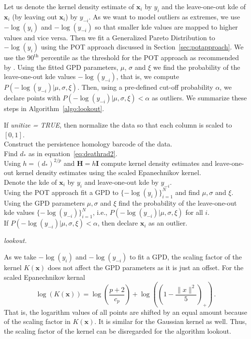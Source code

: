 \documentclass[letter,12pt]{article}
\begin{document}
Let us denote the kernel density estimate of $\bm{x}_i$ by $y_i$ and the leave-one-out kde of $\bm{x}_i$ (by leaving out $\bm{x}_i$) by $y_{-i}$. As we want to model outliers as extremes, we use $-\log(y_i)$ and $-\log(y_{-i})$ so that smaller kde values are mapped to higher values and vice versa.  Then we fit a Generalized Pareto Distribution to  $-\log(y_i)$ using the POT approach discussed in Section~\ref{sec:potapproach}. We use the $90^{\text{th}}$ percentile as the threshold for the POT approach as recommended by \cite{bommier2014peaks}. Using the fitted GPD parameters, $\mu$, $\sigma$ and $\xi$ we find the probability of the  leave-one-out kde values $-\log(y_{-i})$, that is,  we compute $P\left(-\log(y_{-i})|\mu, \sigma,\xi \right)$. Then, using a pre-defined cut-off probability $\alpha$, we declare points with $P\left(-\log(y_{-i})|\mu, \sigma,\xi \right) < \alpha$ as outliers. We summarize these steps in Algorithm~\ref{algo:lookout}.
\DontPrintSemicolon
\begin{algorithm}\fontsize{11}{12}\selectfont
	 If \textit{unitize = TRUE}, then normalize the data so that each column is scaled to $[0,1]$.\\
	 Construct the persistence homology barcode of the data. \\
	 Find $d_*$ as in equation~\eqref{eq:deathrad2}. \\
	 Using $h = (d_*)^{2/p}$ and $\bm{H} = h\bm{I}$ compute kernel density estimates  and leave-one-out kernel density estimates using the scaled Epanechnikov kernel. \\
	 Denote the kde of $\bm{x}_i$ by $y_i$ and leave-one-out kde by $y_{-i}$.\\
	 Using the POT approach fit a GPD to $\{-\log(y_i)\}_{i=1}^N$ and find $\mu, \sigma$ and $\xi$. \\
	 Using the GPD parameters $\mu, \sigma$ and $\xi$ find the probability of the leave-one-out kde values $\{-\log(y_{-i})\}_{i=1}^N$, i.e., $P\left(-\log(y_{-i})|\mu, \sigma, \xi \right)$ for all $i$. \\
	 If $P\left(-\log(y_{-i})|\mu, \sigma, \xi \right) < \alpha$, then declare $\bm{x}_i$ as an outlier. 
	\caption{\itshape lookout.}
	\label{algo:lookout}
\end{algorithm}

As we take $-\log(y_i)$ and $-\log(y_{-i})$ to fit a GPD, the scaling factor of the kernel $K(\bm{x})$ does not affect the GPD parameters as it is just an offset. For the scaled Epanechnikov kernal
\begin{equation}\label{eq:lookout1}
    \log(K(\bm{x}))  = \log\left( \frac{p+2}{c_p}\right) + \log\left( \left(1 -\frac{\| x \|^2}{5} \right)_+\right)\, . 
\end{equation}
That is, the logarithm values of all points are shifted by an equal amount because of the scaling factor in $K(\bm{x})$. It is similar for the Gaussian kernel as well.  Thus, the scaling factor of the kernel can be disregarded for the algorithm lookout. 
\end{document}
